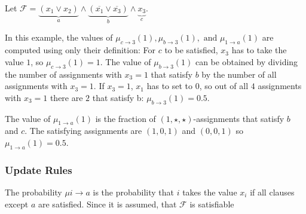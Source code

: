 \begin{example}
Let $\mathcal{F} = \underbrace{(x_1 \lor x_2)}_a \land \underbrace{(\overline{x_1} \lor \overline{x_3})}_b \land \underbrace{x_3}_c $.
\end{example}
\begin{figure}[h]
\centering

\end{figure}
In this example, the values of $\mu_{c \rightarrow 3}(1), \mu_{b \rightarrow 3}(1), \text{ and }\mu_{1 \rightarrow a}(1)$ are computed using only their definition: \newline For $c$ to be satisfied, $x_3$ has to take the value $1$, so $\mu_{c \rightarrow 3}(1) = 1$. The value of $\mu_{b \rightarrow 3}(1)$ can be obtained by dividing the number of assignments with $x_3 = 1$ that satisfy $b$ by the number of all assignments with $x_3 = 1$. If $x_3 = 1$, $x_1$ has to set to $0$, so out of all $4$ assignments with $x_3 = 1$ there are $2$ that satisfy b: $\mu_{b \rightarrow 3}(1) = 0.5$.
 
The value of $\mu_{1 \rightarrow a}(1)$ is the fraction of $(1, \star, \star)$-assignments that satisfy $b$ and $c$. The satisfying assignments are $(1,0,1)$ and $(0,0,1)$ so  $\mu_{1 \rightarrow a}(1) = 0.5$.

\subsubsection{Update Rules}

The probability $\mu{i \rightarrow a}$ is the probability that $i$ takes the value $x_i$ if all clauses except $a$ are satisfied. Since it is assumed, that $\mathcal{F}$ is satisfiable 

